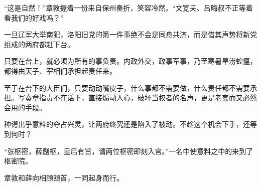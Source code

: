 “这是自然！”章敦握着一份来自保州奏折，笑容冷然，“文宽夫、吕晦叔不正等着看我们的好戏吗？”

一旦辽军大举南犯，洛阳旧党的第一件事绝不会是同舟共济，而是借其声势将新党组成的两府都赶下台。

只要在台上，就必须为所有的事负责。内政外交，政事军事，乃至寒暑旱涝蝗瘟，都得由天子、宰相们承担起责任来。

至于在台下的大臣们，只要动动嘴皮子，什么事都不需要做，什么责任都不需要承担。写奏章指责不在话下，直接煽动人心，破坏当权者的名声，更是老套而又必然会用的手段。

种谔出乎意料的夺占兴灵，让两府终究还是陷入了被动。不趁这个机会下手，还等到何时？

“张枢密，薛副枢，皇后有旨，请两位枢密即刻入宫。”一名中使意料之中的来到了枢密院。

章敦和薛向相顾颔首，一同起身而行。
